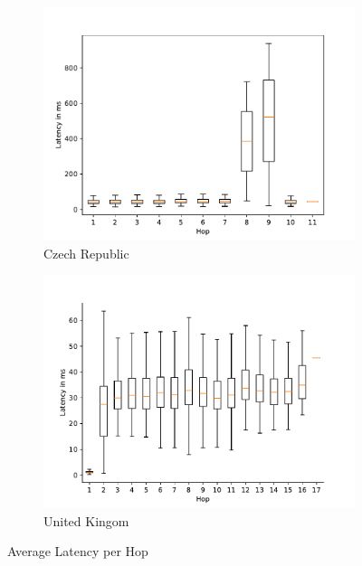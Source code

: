 \begin{figure}
\begin{subfigure}[b]{0.48\linewidth}
		\includegraphics[width=\linewidth]{chapters/4-results/traceroute/img/latency-per-hop-CZ.pdf}
		\caption{Czech Republic}
	\end{subfigure}
	\begin{subfigure}[b]{0.48\linewidth}
		\includegraphics[width=\linewidth]{chapters/4-results/traceroute/img/latency-per-hop-GB.pdf}
		\caption{United Kingom}
	\end{subfigure}
	\caption{Average Latency per Hop}
	\label{fig:latency-change-per-hop-appendix}
\end{figure}


